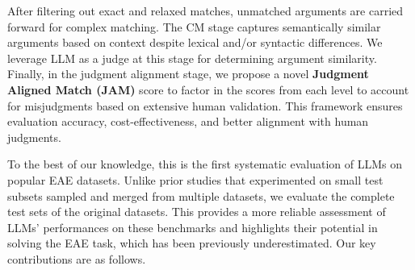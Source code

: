 After filtering out exact and relaxed matches, unmatched arguments are carried forward for complex matching. The CM stage captures semantically similar arguments based on context despite lexical and/or syntactic differences. We leverage LLM as a judge \cite{NEURIPS2023_91f18a12} at this stage for determining argument similarity. Finally, in the judgment alignment stage, we propose a novel \textbf{Judgment Aligned Match (JAM)} score to factor in the scores from each level to account for misjudgments based on extensive human validation. This framework ensures evaluation accuracy, cost-effectiveness, and better alignment with human judgments. 

To the best of our knowledge, this is the first systematic evaluation of LLMs on popular EAE datasets. Unlike prior studies \cite{lu2024exactmatchsemanticallyreassessing, huang-etal-2024-textee} that experimented on small test subsets sampled and merged from multiple datasets, we evaluate the complete test sets of the original datasets. This provides a more reliable assessment of LLMs' performances on these benchmarks and highlights their potential in solving the EAE task, which has been previously underestimated. Our key contributions are as follows.

